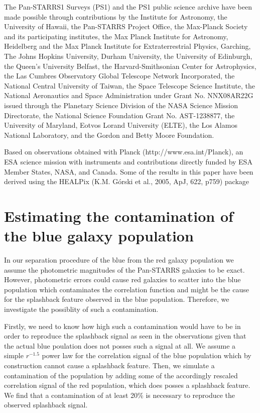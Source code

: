 \documentclass[iop, apjl, twocolappendix, numberedappendix]{emulateapj}
\begin{document}
The Pan-STARRS1 Surveys (PS1) and the PS1 public science archive
have been made possible through contributions by the Institute for
Astronomy, the University of Hawaii, the Pan-STARRS Project Office,
the Max-Planck Society and its participating institutes, the Max
Planck Institute for Astronomy, Heidelberg and the Max Planck
Institute for Extraterrestrial Physics, Garching, The Johns Hopkins
University, Durham University, the University of Edinburgh, the
Queen's University Belfast, the Harvard-Smithsonian Center for
Astrophysics, the Las Cumbres Observatory Global Telescope Network
Incorporated, the National Central University of Taiwan, the Space
Telescope Science Institute, the National Aeronautics and Space
Administration under Grant No. NNX08AR22G issued through the
Planetary Science Division of the NASA Science Mission Directorate,
the National Science Foundation Grant No. AST-1238877, the
University of Maryland, Eotvos Lorand University (ELTE), the Los
Alamos National Laboratory, and the Gordon and Betty Moore
Foundation.

Based on observations obtained with Planck
(http://www.esa.int/Planck), an ESA science mission with instruments
and contributions directly funded by ESA Member States, NASA, and
Canada.  Some of the results in this paper have been derived using
the HEALPix (K.M. Górski et al., 2005, ApJ, 622, p759) package


 

\appendix

\section{Estimating the contamination of the blue galaxy population}
\label{sec:Errors}
In our separation procedure of the blue from the red galaxy population 
we assume the photometric magnitudes of the Pan-STARRS galaxies to be exact.
However, photometric errors could cause red galaxies to scatter into the blue
population which contaminates the correlation function and might be the cause 
for the splashback feature observed in the blue population. Therefore, we 
investigate the possiblity of such a contamination. 

Firstly, we need to know how high such a contamination would have to be in order
to reproduce the splashback signal as seen in the observations given that the actual
blue poulation does not posses such a signal at all. We assume a simple $r^{-1.5}$ power 
law for the correlation signal of the blue population which by construction cannot cause a splashback feature. Then,
we simulate a contamination of the population by adding some of the accordingly rescaled 
correlation signal of the red population, which does posses a splashback feature.
We find that a contamination of at least 20\% is necessary to reproduce the observed
splashback signal.
\end{document}
